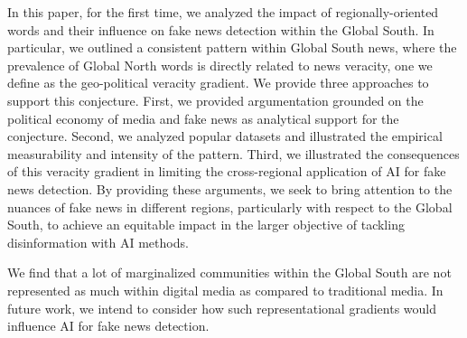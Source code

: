 \documentclass[runningheads]{llncs}
\begin{document}
 In this paper, for the first time, we analyzed the impact of regionally-oriented words and their influence on fake news detection within the Global South. In particular, we outlined a consistent pattern within Global South news, where the prevalence of Global North words is directly related to news veracity, one we define as the geo-political veracity gradient. We provide three approaches to support this conjecture. First, we provided argumentation grounded on the political economy of media and fake news as analytical support for the conjecture. Second, we analyzed popular datasets and illustrated the empirical measurability and intensity of the pattern. Third, we illustrated the consequences of this veracity gradient in limiting the cross-regional application of AI for fake news detection. By providing these arguments, we seek to bring attention to the nuances of fake news in different regions, particularly with respect to the Global South, to achieve an equitable impact in the larger objective of tackling disinformation with AI methods. 

 We find that a lot of marginalized communities within the Global South are not represented as much within digital media as compared to traditional media. In future work, we intend to consider how such representational gradients would influence AI for fake news detection. 



\end{document}
